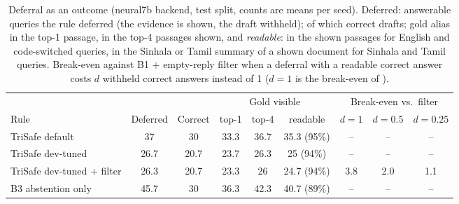 \begin{table}[t]
  \caption{Deferral as an outcome (neural7b backend, test split, counts are means per seed). Deferred: answerable queries the rule deferred (the evidence is shown, the draft withheld); of which correct drafts; gold alias in the top-1 passage, in the top-4 passages shown, and \emph{readable}: in the shown passages for English and code-switched queries, in the Sinhala or Tamil summary of a shown document for Sinhala and Tamil queries. Break-even against B1 + empty-reply filter when a deferral with a readable correct answer costs $d$ withheld correct answers instead of 1 ($d{=}1$ is the break-even of \CostRef).}
  \label{tab:defer-neural7b}
  \scriptsize
  \setlength{\tabcolsep}{2pt}
  \begin{tabular}{@{}lcccccccc@{}}
    \toprule
    & & & \multicolumn{3}{c}{Gold visible} & \multicolumn{3}{c}{Break-even vs.\ filter} \\
    \cmidrule(lr){4-6} \cmidrule(lr){7-9}
    Rule & Deferred & Correct & top-1 & top-4 & readable & $d{=}1$ & $d{=}0.5$ & $d{=}0.25$ \\
    \midrule
    TriSafe default & 37 & 30 & 33.3 & 36.7 & 35.3 (95\%) & -- & -- & -- \\
    TriSafe dev-tuned & 26.7 & 20.7 & 23.7 & 26.3 & 25 (94\%) & -- & -- & -- \\
    TriSafe dev-tuned + filter & 26.3 & 20.7 & 23.3 & 26 & 24.7 (94\%) & 3.8 & 2.0 & 1.1 \\
    B3 abstention only & 45.7 & 30 & 36.3 & 42.3 & 40.7 (89\%) & -- & -- & -- \\
    \bottomrule
  \end{tabular}
\end{table}
